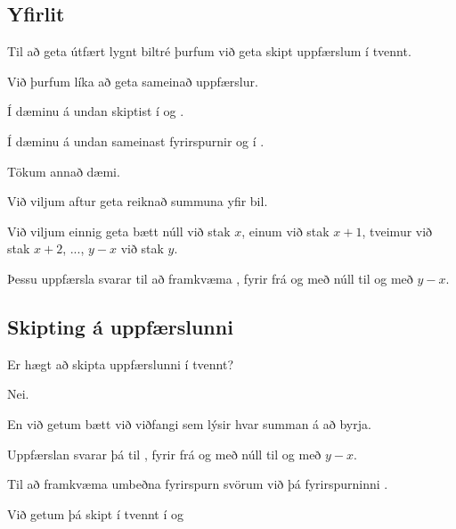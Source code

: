 \subsection{Yfirlit}
{
    {
        \item<1-> Til að geta útfært lygnt biltré þurfum við geta skipt uppfærslum í tvennt.
        \item<2-> Við þurfum líka að geta sameinað uppfærslur.
        \item<3-> Í dæminu á undan skiptist  í  og .
        \item<4-> Í dæminu á undan sameinast fyrirspurnir  og  í .
        \item<5-> Tökum annað dæmi.
        \item<6-> Við viljum aftur geta reiknað summuna yfir bil.
        \item<7-> Við viljum einnig geta bætt núll við stak $x$, einum við stak $x + 1$, tveimur við stak $x + 2$, ..., $y - x$ við stak $y$.
        \item<8-> Þessu uppfærsla svarar til að framkvæma , fyrir  frá og með núll til og með $y - x$.
    }
}

\subsection{Skipting á uppfærslunni}
{
    {
        \item<1-> Er hægt að skipta uppfærslunni  í tvennt?
        \item<2-> Nei.
        \item<3-> En við getum bætt við viðfangi sem lýsir hvar summan á að byrja.
        \item<4-> Uppfærslan  svarar þá til , fyrir  frá og með núll til og með $y - x$.
        \item<5-> Til að framkvæma umbeðna fyrirspurn svörum við þá fyrirspurninni .
        \item<6-> Við getum þá skipt  í tvennt í  og 
    }
}

